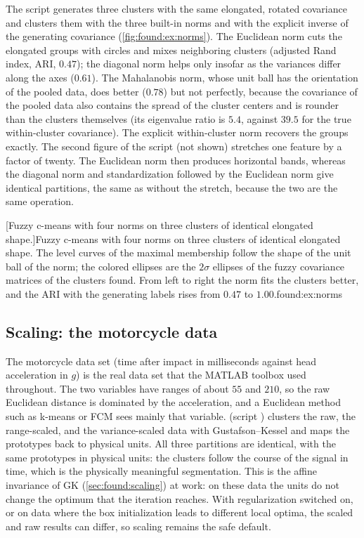 The script  generates three clusters with the same elongated, rotated covariance and clusters them with the three built-in norms and with the explicit inverse of the generating covariance (\cref{fig:found:ex:norms}). The Euclidean norm cuts the elongated groups with circles and mixes neighboring clusters (adjusted Rand index, ARI, $0.47$); the diagonal norm helps only insofar as the variances differ along the axes ($0.61$). The Mahalanobis norm, whose unit ball has the orientation of the pooled data, does better ($0.78$) but not perfectly, because the covariance of the pooled data also contains the spread of the cluster centers and is rounder than the clusters themselves (its eigenvalue ratio is $5.4$, against $39.5$ for the true within-cluster covariance). The explicit within-cluster norm recovers the groups exactly. The second figure of the script (not shown) stretches one feature by a factor of twenty. The Euclidean norm then produces horizontal bands, whereas the diagonal norm and standardization followed by the Euclidean norm give identical partitions, the same as without the stretch, because the two are the same operation.

[Fuzzy c-means with four norms on three clusters of identical elongated shape.]{Fuzzy c-means with four norms on three clusters of identical elongated shape. The level curves of the maximal membership follow the shape of the unit ball of the norm; the colored ellipses are the $2\sigma$ ellipses of the fuzzy covariance matrices of the clusters found. From left to right the norm fits the clusters better, and the ARI with the generating labels rises from $0.47$ to $1.00$.}{found:ex:norms}

\subsection{Scaling: the motorcycle data}\label{sec:found:ex:scaling}

The motorcycle data set (time after impact in milliseconds against head acceleration in $g$) is the real data set that the MATLAB toolbox used throughout. The two variables have ranges of about $55$ and $210$, so the raw Euclidean distance is dominated by the acceleration, and a Euclidean method such as k-means or FCM sees mainly that variable.  (script ) clusters the raw, the range-scaled, and the variance-scaled data with Gustafson--Kessel and maps the prototypes back to physical units. All three partitions are identical, with the same prototypes in physical units: the clusters follow the course of the signal in time, which is the physically meaningful segmentation. This is the affine invariance of GK (\cref{sec:found:scaling}) at work: on these data the units do not change the optimum that the iteration reaches. With regularization switched on, or on data where the box initialization leads to different local optima, the scaled and raw results can differ, so scaling remains the safe default.

